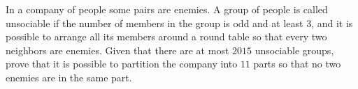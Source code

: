 In a company of people some pairs are enemies. A group of people is called 
unsociable
 if the number of members in the group is odd and at least 
$3$, 
 and it is possible to arrange all its members around a round table so that every two neighbors are enemies. Given that there are at most 
$2015$
 unsociable groups, prove that it is possible to partition the company into 
$11$
 parts so that no two enemies are in the same part.